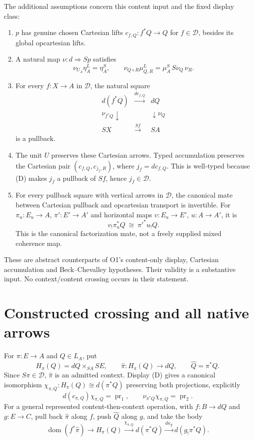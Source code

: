 \documentclass[11pt]{article}
\begin{document}
The additional assumptions concern this content input and the fixed display class:
\begin{enumerate}
\item $p$ has genuine chosen Cartesian lifts $c_{f,Q}:f^*Q\to Q$ for $f\in\mathcal D$, besides its global opcartesian lifts.
\item A natural map $\nu:d\Rightarrow Sp$ satisfies
\[
 \nu_{U_A}\eta^L_A=\eta^S_A,\qquad
 \nu_{Q\diamond R}\mu^L_{Q,R}=\mu^S_A\,S\nu_Q\,\nu_R.
\tag{V}
\]
\item For every $f:X\to A$ in $\mathcal D$, the natural square
\[
 \begin{array}{ccc}d(f^*Q)&\xrightarrow{dc_{f,Q}}&dQ\\
 \nu_{f^*Q}\downarrow&&\downarrow\nu_Q\\
 SX&\xrightarrow{Sf}&SA\end{array}
\tag{D}
\]
is a pullback.
\item The unit $U$ preserves these Cartesian arrows. Typed accumulation preserves the Cartesian pair $(c_{f,Q},c_{j_f,R})$, where $j_f=dc_{f,Q}$. This is well-typed because (D) makes $j_f$ a pullback of $Sf$, hence $j_f\in\mathcal D$.
\item For every pullback square with vertical arrows in $\mathcal D$, the canonical mate between Cartesian pullback and opcartesian transport is invertible. For
$\pi_u:E_u\to A$, $\pi':E'\to A'$ and horizontal maps $v:E_u\to E'$, $u:A\to A'$, it is
\[
 v_!\pi_u^*Q\ \cong\ \pi'^*u_!Q.
\tag{BC}
\]
This is the canonical factorization mate, not a freely supplied mixed coherence map.
\end{enumerate}
These are abstract counterparts of O1's content-only display, Cartesian accumulation and Beck--Chevalley hypotheses. Their validity is a substantive input. No context/content crossing occurs in their statement.

\section{Constructed crossing and all native arrows}
For $\pi:E\to A$ and $Q\in L_A$, put
\[
 H_\pi(Q)=dQ\times_{SA}SE,\qquad
 \widehat\pi:H_\pi(Q)\to dQ,\qquad \widehat Q=\pi^*Q.
\tag{X}
\]
Since $S\pi\in\mathcal D$, $\widehat\pi$ is an admitted context. Display (D) gives a canonical isomorphism
$\chi_{\pi,Q}:H_\pi(Q)\cong d(\pi^*Q)$ preserving both projections, explicitly
\[d(c_{\pi,Q})\chi_{\pi,Q}=\operatorname{pr}_1,\qquad \nu_{\pi^*Q}\chi_{\pi,Q}=\operatorname{pr}_2.\]
For a general represented content-then-context operation, with $f:B\to dQ$ and $g:E\to C$, pull back $\widehat\pi$ along $f$, push $\widehat Q$ along $g$, and take the body
\[
 \operatorname{dom}(f^*\widehat\pi)\to H_\pi(Q)
 \xrightarrow{\chi_{\pi,Q}}d(\pi^*Q)
 \xrightarrow{d\kappa_g}d(g_!\pi^*Q).
\tag{G}
\]
\end{document}
